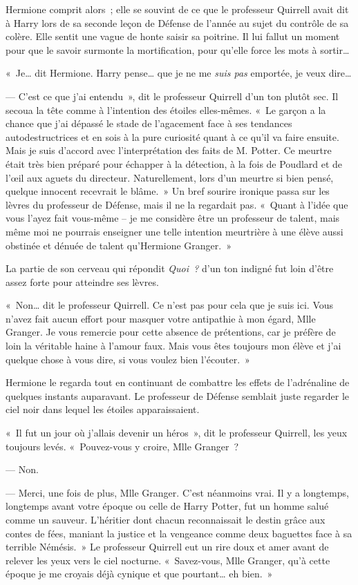 Hermione comprit alors~; elle se souvint de ce que le professeur Quirrell avait dit à Harry lors de sa seconde leçon de Défense de l'année au sujet du contrôle de sa colère.
Elle sentit une vague de honte saisir sa poitrine.
Il lui fallut un moment pour que le savoir surmonte la mortification, pour qu'elle force les mots à sortir…

«~Je… dit Hermione.
Harry pense… que je ne me \emph{suis pas} emportée, je veux dire…

--- C'est ce que j'ai entendu~», dit le professeur Quirrell d'un ton plutôt sec.
Il secoua la tête comme à l'intention des étoiles elles-mêmes.
«~Le garçon a la chance que j'ai dépassé le stade de l'agacement face à ses tendances autodestructrices et en sois à la pure curiosité quant à ce qu'il va faire ensuite.
Mais je suis d'accord avec l'interprétation des faits de M. Potter.
Ce meurtre était très bien préparé pour échapper à la détection, à la fois de Poudlard et de l'œil aux aguets du directeur.
Naturellement, lors d'un meurtre si bien pensé, quelque innocent recevrait le blâme.~»
Un bref sourire ironique passa sur les lèvres du professeur de Défense, mais il ne la regardait pas.
«~Quant à l'idée que vous l'ayez fait vous-même -- je me considère être un professeur de talent, mais même moi ne pourrais enseigner une telle intention meurtrière à une élève aussi obstinée et dénuée de talent qu'Hermione Granger.~»

La partie de son cerveau qui répondit \emph{Quoi~?} d'un ton indigné fut loin d'être assez forte pour atteindre ses lèvres.

«~Non… dit le professeur Quirrell.
Ce n'est pas pour cela que je suis ici.
Vous n'avez fait aucun effort pour masquer votre antipathie à mon égard, Mlle Granger.
Je vous remercie pour cette absence de prétentions, car je préfère de loin la véritable haine à l'amour faux.
Mais vous êtes toujours mon élève et j'ai quelque chose à vous dire, si vous voulez bien l'écouter.~»

Hermione le regarda tout en continuant de combattre les effets de l'adrénaline de quelques instants auparavant.
Le professeur de Défense semblait juste regarder le ciel noir dans lequel les étoiles apparaissaient.

«~Il fut un jour où j'allais devenir un héros~», dit le professeur Quirrell, les yeux toujours levés.
«~Pouvez-vous y croire, Mlle Granger~?

--- Non.

--- Merci, une fois de plus, Mlle Granger.
C'est néanmoins vrai.
Il y a longtemps, longtemps avant votre époque ou celle de Harry Potter, fut un homme salué comme un sauveur.
L'héritier dont chacun reconnaissait le destin grâce aux contes de fées, maniant la justice et la vengeance comme deux baguettes face à sa terrible Némésis.~»
Le professeur Quirrell eut un rire doux et amer avant de relever les yeux vers le ciel nocturne.
«~Savez-vous, Mlle Granger, qu'à cette époque je me croyais déjà cynique et que pourtant… eh bien.~»

